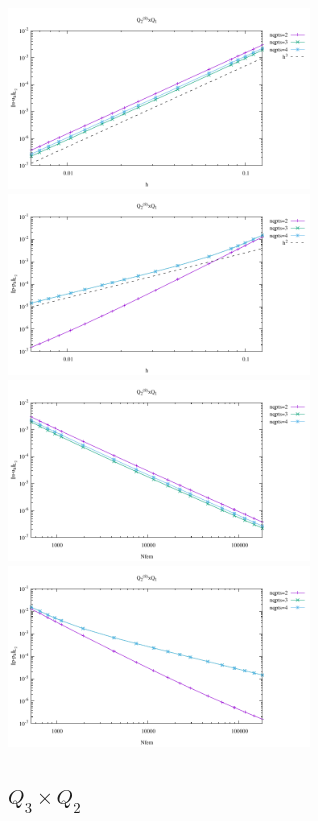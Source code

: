 \begin{center}
\includegraphics[width=8cm]{python_codes/fieldstone_120/results/Q2sQ1-velocity-h.pdf}
\includegraphics[width=8cm]{python_codes/fieldstone_120/results/Q2sQ1-pressure-h.pdf}\\
\includegraphics[width=8cm]{python_codes/fieldstone_120/results/Q2sQ1-velocity-Nfem.pdf}
\includegraphics[width=8cm]{python_codes/fieldstone_120/results/Q2sQ1-pressure-Nfem.pdf}
\end{center}

\newpage
\subsection*{$Q_3\times Q_2$}

